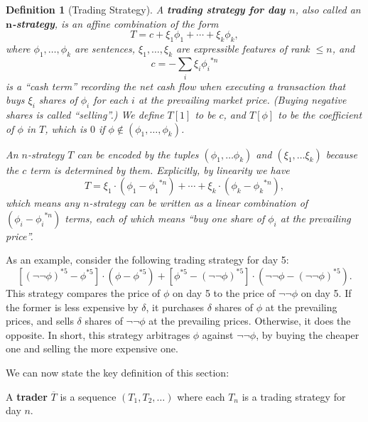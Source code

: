 \documentclass[authordate,onecolumn,noenvironments]{miri-tech-article}
\newtheorem{definition}[theorem]{Definition}
\numberwithin{equation}{subsection}
\newcommand{\seq}[1]{{\overline{#1}}}
\newcommand{\exf}{\xi}
\newcommand{\cash}{c}
\newcommand{\nn}{n}
\newcommand{\trade}{T}%
\newcommand{\Trader}{\seq{\trade}} %
\newcommand{\pf}[2][\nn]{{#2}^{*#1}}
\begin{document}
\begin{definition}[Trading Strategy]\label{def:tradestrat}
  A \textbf{trading strategy for day $\nn$}, also called an \textbf{$\bm \nn$-strategy}, is an affine combination of the form
  \[
    \trade = \cash + \exf_1\phi_1 + \cdots + \exf_k\phi_k,
  \]
  where $\phi_1,\ldots,\phi_k$ are sentences, $\exf_1,\ldots,\exf_k$ are expressible features of rank $\leq \nn$, and
  \[
    \cash = -\sum_i \exf_i \pf{\phi_i}
  \]
  is a ``cash term'' recording the net cash flow when executing a transaction that buys $\exf_i$ shares of $\phi_i$ for each $i$ at the prevailing market price. (Buying negative shares is called ``selling''.)
  We define $\trade[1]$ to be $\cash$, and $\trade[\phi]$ to be the coefficient of $\phi$ in $\trade$, which is $0$ if $\phi \not\in (\phi_1, \ldots, \phi_k)$.  
  
  An $\nn$-strategy $T$ can be encoded by the tuples $ (\phi_1,\ldots\phi_k)$ and $(\exf_1,\ldots\exf_k)$ because the $\cash$ term is determined by them.  Explicitly, by linearity we have
  \[
    \trade = \exf_1 \cdot (\phi_1 - \pf{\phi_1}) + \cdots + \exf_k \cdot (\phi_k - \pf{\phi_k}),
  \]
  which means any $\nn$-strategy can be written as a linear combination of $(\phi_i - \pf{\phi_i})$ terms, each of which means ``buy one share of $\phi_i$ at the prevailing price''.
\end{definition}

As an example, consider the following trading strategy for day 5:
\[
  \left[
    \pf[5]{(\lnot\lnot\phi)} - \pf[5]{\phi}
  \right]
  \cdot
  \left(
    \phi - \pf[5]{\phi}
  \right)
  +
  \left[
    \pf[5]{\phi} - \pf[5]{(\lnot\lnot\phi)}
  \right]
  \cdot
  \left(
    \lnot\lnot\phi - \pf[5]{(\lnot\lnot\phi)}
  \right).
\]
This strategy compares the price of $\phi$ on day 5 to the price of $\lnot\lnot\phi$ on day 5. If the former is less expensive by $\delta$, it purchases $\delta$ shares of $\phi$ at the prevailing prices, and sells $\delta$ shares of $\lnot\lnot\phi$ at the prevailing prices. Otherwise, it does the opposite. In short, this strategy arbitrages $\phi$ against $\lnot\lnot\phi$, by buying the cheaper one and selling the more expensive one.

We can now state the key definition of this section:

\begin{keydef}[Trader]\label{def:trader}
  A \textbf{trader} $\Trader$ is a sequence $(\trade_1, \trade_2, \ldots)$ where each $\trade_\nn$ is a trading strategy for day $\nn$.
\end{keydef}
\end{document}
